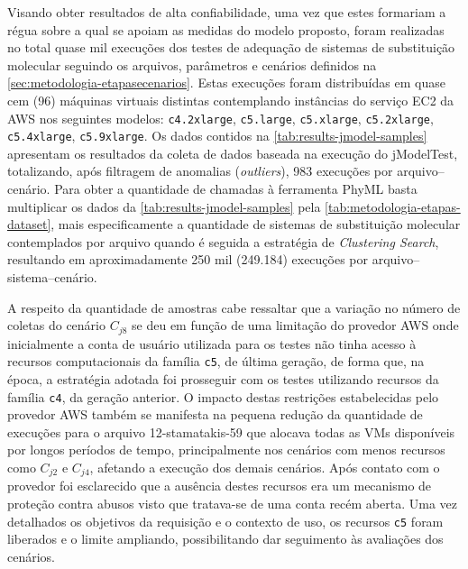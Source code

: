 \documentclass[english,brazilian]{UNISINOSmonografia} %
\begin{document}
Visando obter resultados de alta confiabilidade, uma vez que estes formariam a régua sobre a qual se apoiam as medidas do modelo proposto, foram realizadas no total quase mil execuções dos testes de adequação de sistemas de substituição molecular seguindo os arquivos, parâmetros e cenários definidos na \autoref{sec:metodologia-etapasecenarios}.
%
Estas execuções foram distribuídas em quase cem (96) máquinas virtuais distintas contemplando instâncias do serviço EC2 da AWS nos seguintes modelos: \texttt{c4.2xlarge}, \texttt{c5.large}, \texttt{c5.xlarge}, \texttt{c5.2xlarge}, \texttt{c5.4xlarge}, \texttt{c5.9xlarge}.
%
Os dados contidos na \autoref{tab:results-jmodel-samples} apresentam os resultados da coleta de dados baseada na execução do jModelTest, totalizando, após filtragem de anomalias (\textit{outliers}), 983 execuções por arquivo--cenário.
%
Para obter a quantidade de chamadas à ferramenta PhyML basta multiplicar os dados da \autoref{tab:results-jmodel-samples} pela \autoref{tab:metodologia-etapas-dataset}, mais especificamente a quantidade de sistemas de substituição molecular contemplados por arquivo quando é seguida a estratégia de \textit{Clustering Search}, resultando em aproximadamente 250 mil (249.184) execuções por arquivo--sistema--cenário.


A respeito da quantidade de amostras cabe ressaltar que a variação no número de coletas do cenário $C_{j8}$ se deu em função de uma limitação do provedor AWS onde inicialmente a conta de usuário utilizada para os testes não tinha acesso à recursos computacionais da família \texttt{c5}, de última geração, de forma que, na época, a estratégia adotada foi prosseguir com os testes utilizando recursos da família \texttt{c4}, da geração anterior.
%
O impacto destas restrições estabelecidas pelo provedor AWS também se manifesta na pequena redução da quantidade de execuções para o arquivo 12-stamatakis-59 que alocava todas as VMs disponíveis por longos períodos de tempo, principalmente nos cenários com menos recursos como $C_{j2}$ e $C_{j4}$, afetando a execução dos demais cenários.
%
Após contato com o provedor foi esclarecido que a ausência destes recursos era um mecanismo de proteção contra abusos visto que tratava-se de uma conta recém aberta.
%
Uma vez detalhados os objetivos da requisição e o contexto de uso, os recursos \texttt{c5} foram liberados e o limite ampliando, possibilitando dar seguimento às avaliações dos cenários.
\end{document}
